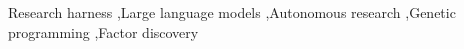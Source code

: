 \documentclass[5p,twocolumn,authoryear,lefttitle]{elsarticle}
\begin{document}
\begin{frontmatter}
\title{}
\begin{abstract}

\end{abstract}
\begin{keyword}
Research harness \sep Large language models \sep Autonomous research \sep Genetic programming \sep Factor discovery
\end{keyword}
\end{frontmatter}



\end{document}
